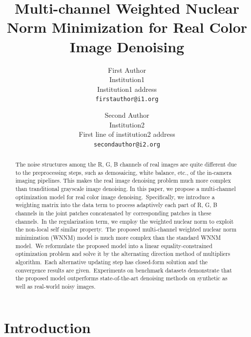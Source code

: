 \documentclass[10pt,twocolumn,letterpaper,sort&compress]{article}
\begin{document}
\title{Multi-channel Weighted Nuclear Norm Minimization for Real Color Image Denoising}

\author{First Author\\
Institution1\\
Institution1 address\\
{\tt\small firstauthor@i1.org}
\and
Second Author\\
Institution2\\
First line of institution2 address\\
{\tt\small secondauthor@i2.org}
}

\maketitle

\begin{abstract}
The noise structures among the R, G, B channels of real images are quite different due to the preprocessing steps, such as demosaicing, white balance, etc., of the in-camera imaging pipelines. This makes the real image denoising problem much more complex than tranditional grayscale image denoising. In this paper, we propose a multi-channel optimization model for real color image denoising.\ Specifically, we introduce a weighting matrix into the data term to process adaptively each part of R, G, B channels in the joint patches concatenated by corresponding patches in these channels.\ In the regularization term, we employ the weighted nuclear norm to exploit the non-local self similar property.\ The proposed multi-channel weighted nuclear norm minimization (WNNM) model is much more complex than the standard WNNM model.\ We reformulate the proposed model into a linear equality-constrained optimization problem and solve it by the alternating direction method of multipliers algorithm.\ Each alternative updating step has closed-form solution and the convergence results are given.\ Experiments on benchmark datasets demonstrate that the proposed model outperforms state-of-the-art denoising methods on synthetic as well as real-world noisy images.
\end{abstract}

\section{Introduction}
\end{document}
